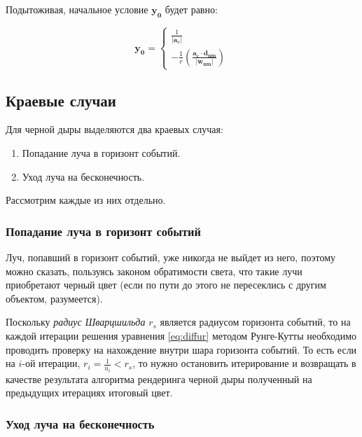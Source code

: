 Подытоживая, начальное условие $\mathbf{y_0}$ будет равно:

\begin{equation}
\label{eq:runge-kutte_y0}
    \mathbf{y_0} =
    \begin{cases}
        \frac{1}{\left|\mathbf{a_c}\right|}
        \\
        -\frac{1}{r}\left(\frac{\mathbf{a_c} \cdot \mathbf{d_{nm}}}{\left|\mathbf{w_{nm}}\right|}\right)
    \end{cases}
\end{equation}

\newpage

\subsection{Краевые случаи}
\label{subsec:corner_cases}
Для черной дыры выделяются два краевых случая:

\begin{enumerate}
    \item Попадание луча в горизонт событий.
    \item Уход луча на бесконечность.
\end{enumerate}

Рассмотрим каждые из них отдельно.

\subsubsection{Попадание луча в горизонт событий}
\label{subsubsec:events_horizon}

Луч, попавший в горизонт событий, уже никогда не выйдет из него, поэтому можно сказать, пользуясь законом обратимости света, что такие лучи приобретают черный цвет (если по пути до этого не пересеклись с другим объектом, разумеется).

Поскольку \textit{радиус Шварцшильда} $r_s$ является радиусом горизонта событий, то на каждой итерации решения уравнения \eqref{eq:diffur} методом Рунге-Кутты необходимо проводить проверку на нахождение внутри шара горизонта событий. То есть если на $i$-ой итерации, $r_i = \frac{1}{u_i} < r_s$, то нужно остановить итерирование и возвращать в качестве результата алгоритма рендеринга черной дыры полученный на предыдущих итерациях итоговый цвет.

\subsubsection{Уход луча на бесконечность}
\label{subsubsec:goes_to_infinity}

